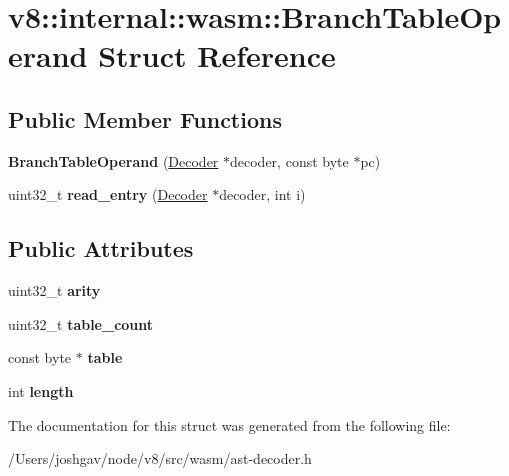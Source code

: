 \hypertarget{structv8_1_1internal_1_1wasm_1_1_branch_table_operand}{}\section{v8\+:\+:internal\+:\+:wasm\+:\+:Branch\+Table\+Operand Struct Reference}
\label{structv8_1_1internal_1_1wasm_1_1_branch_table_operand}
\subsection*{Public Member Functions}
\begin{DoxyCompactItemize}
\item 
{\bfseries Branch\+Table\+Operand} (\hyperlink{classv8_1_1internal_1_1wasm_1_1_decoder}{Decoder} $\ast$decoder, const byte $\ast$pc)\hypertarget{structv8_1_1internal_1_1wasm_1_1_branch_table_operand_a173e120e5e4f2e6621051cede063265b}{}\label{structv8_1_1internal_1_1wasm_1_1_branch_table_operand_a173e120e5e4f2e6621051cede063265b}

\item 
uint32\+\_\+t {\bfseries read\+\_\+entry} (\hyperlink{classv8_1_1internal_1_1wasm_1_1_decoder}{Decoder} $\ast$decoder, int i)\hypertarget{structv8_1_1internal_1_1wasm_1_1_branch_table_operand_af5a2ee3e027c80fb4d66aa0ff7757ccc}{}\label{structv8_1_1internal_1_1wasm_1_1_branch_table_operand_af5a2ee3e027c80fb4d66aa0ff7757ccc}

\end{DoxyCompactItemize}
\subsection*{Public Attributes}
\begin{DoxyCompactItemize}
\item 
uint32\+\_\+t {\bfseries arity}\hypertarget{structv8_1_1internal_1_1wasm_1_1_branch_table_operand_a6fb6cd80021e701764f2c3d24c665227}{}\label{structv8_1_1internal_1_1wasm_1_1_branch_table_operand_a6fb6cd80021e701764f2c3d24c665227}

\item 
uint32\+\_\+t {\bfseries table\+\_\+count}\hypertarget{structv8_1_1internal_1_1wasm_1_1_branch_table_operand_a8d31f5db1565a908884bbdd726226d1a}{}\label{structv8_1_1internal_1_1wasm_1_1_branch_table_operand_a8d31f5db1565a908884bbdd726226d1a}

\item 
const byte $\ast$ {\bfseries table}\hypertarget{structv8_1_1internal_1_1wasm_1_1_branch_table_operand_a05932575b711e077d06f09b332342e0e}{}\label{structv8_1_1internal_1_1wasm_1_1_branch_table_operand_a05932575b711e077d06f09b332342e0e}

\item 
int {\bfseries length}\hypertarget{structv8_1_1internal_1_1wasm_1_1_branch_table_operand_ac26475aa8031ec43dd14d9770887ad8b}{}\label{structv8_1_1internal_1_1wasm_1_1_branch_table_operand_ac26475aa8031ec43dd14d9770887ad8b}

\end{DoxyCompactItemize}


The documentation for this struct was generated from the following file\+:\begin{DoxyCompactItemize}
\item 
/\+Users/joshgav/node/v8/src/wasm/ast-\/decoder.\+h\end{DoxyCompactItemize}
